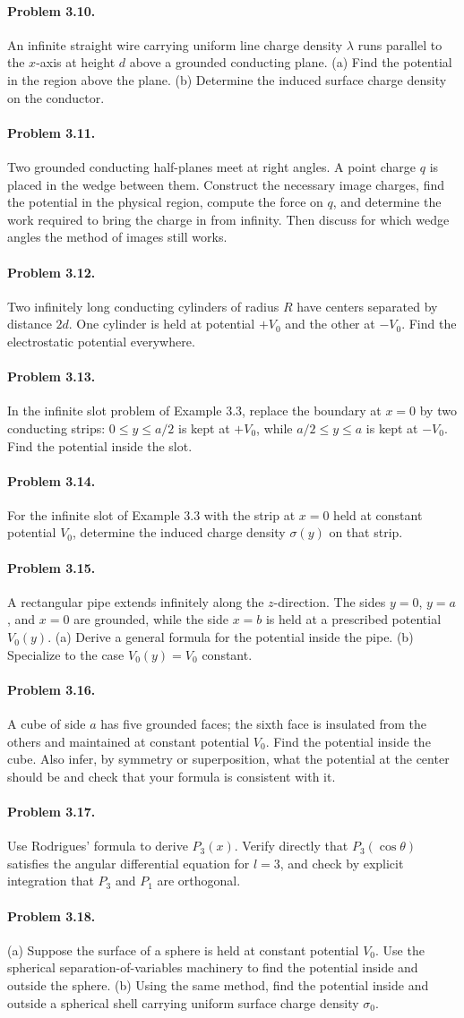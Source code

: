 \documentclass{aa}
\newcommand{\problemstatement}[2]{%
\paragraph{Problem #1.}#2\par\medskip
}
\begin{document}
\problemstatement{3.10}{An infinite straight wire carrying uniform line charge density \(\lambda\) runs parallel to the \(x\)-axis at height \(d\) above a grounded conducting plane. (a) Find the potential in the region above the plane. (b) Determine the induced surface charge density on the conductor.}
\problemstatement{3.11}{Two grounded conducting half-planes meet at right angles. A point charge \(q\) is placed in the wedge between them. Construct the necessary image charges, find the potential in the physical region, compute the force on \(q\), and determine the work required to bring the charge in from infinity. Then discuss for which wedge angles the method of images still works.}
\problemstatement{3.12}{Two infinitely long conducting cylinders of radius \(R\) have centers separated by distance \(2d\). One cylinder is held at potential \(+V_0\) and the other at \(-V_0\). Find the electrostatic potential everywhere.}
\problemstatement{3.13}{In the infinite slot problem of Example 3.3, replace the boundary at \(x=0\) by two conducting strips: \(0 \le y \le a/2\) is kept at \(+V_0\), while \(a/2 \le y \le a\) is kept at \(-V_0\). Find the potential inside the slot.}
\problemstatement{3.14}{For the infinite slot of Example 3.3 with the strip at \(x=0\) held at constant potential \(V_0\), determine the induced charge density \(\sigma(y)\) on that strip.}
\problemstatement{3.15}{A rectangular pipe extends infinitely along the \(z\)-direction. The sides \(y=0\), \(y=a\), and \(x=0\) are grounded, while the side \(x=b\) is held at a prescribed potential \(V_0(y)\). (a) Derive a general formula for the potential inside the pipe. (b) Specialize to the case \(V_0(y)=V_0\) constant.}
\problemstatement{3.16}{A cube of side \(a\) has five grounded faces; the sixth face is insulated from the others and maintained at constant potential \(V_0\). Find the potential inside the cube. Also infer, by symmetry or superposition, what the potential at the center should be and check that your formula is consistent with it.}
\problemstatement{3.17}{Use Rodrigues' formula to derive \(P_3(x)\). Verify directly that \(P_3(\cos\theta)\) satisfies the angular differential equation for \(l=3\), and check by explicit integration that \(P_3\) and \(P_1\) are orthogonal.}
\problemstatement{3.18}{(a) Suppose the surface of a sphere is held at constant potential \(V_0\). Use the spherical separation-of-variables machinery to find the potential inside and outside the sphere. (b) Using the same method, find the potential inside and outside a spherical shell carrying uniform surface charge density \(\sigma_0\).}
\end{document}
